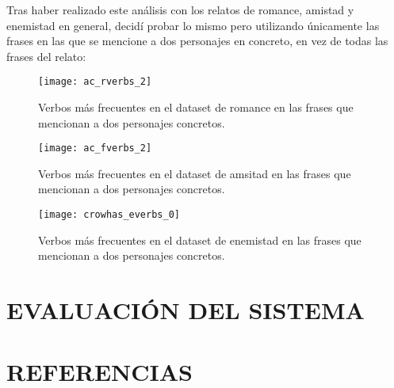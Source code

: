 \documentclass{pre-tfg}
\begin{document}

Tras haber realizado este análisis con los relatos de romance, amistad y enemistad en general, decidí probar lo mismo pero utilizando únicamente las frases en las que se mencione a dos personajes en concreto, en vez de todas las frases del relato:

\begin{figure}
	\centering
	\texttt{[image: ac\_rverbs\_2]}
	\caption{Verbos más frecuentes en el dataset de romance en las frases que mencionan a dos personajes concretos.}
	\label{fig:r_verb_freq_in_character_mentions}
\end{figure}


\begin{figure}
	\centering
	\texttt{[image: ac\_fverbs\_2]}
	\caption{Verbos más frecuentes en el dataset de amsitad en las frases que mencionan a dos personajes concretos.}
	\label{fig:f_verb_freq_in_character_mentions}
\end{figure}


\begin{figure}
	\centering
	\texttt{[image: crowhas\_everbs\_0]}
	\caption{Verbos más frecuentes en el dataset de enemistad en las frases que mencionan a dos personajes concretos.}
	\label{fig:e_verb_freq_in_character_mentions}
\end{figure}






\section{EVALUACIÓN DEL SISTEMA}


\section{REFERENCIAS}





\singlespacing
%

\end{document}

